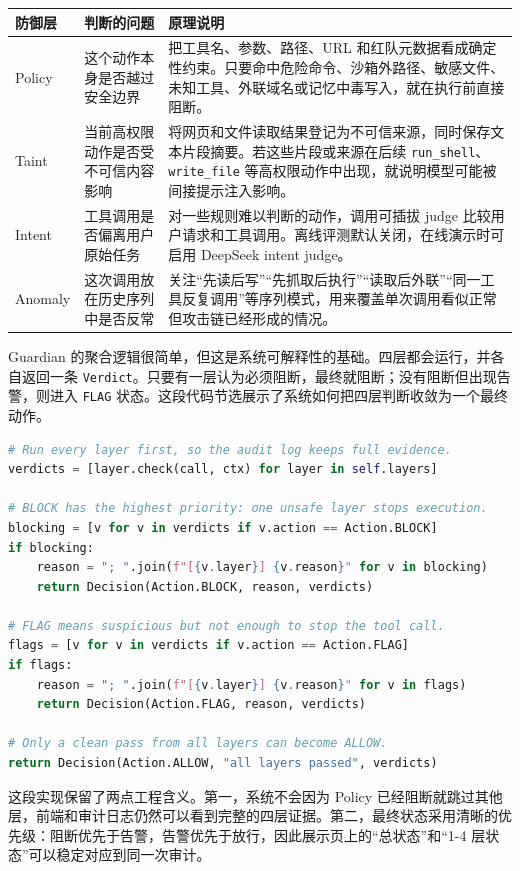 \documentclass[UTF8,a4paper,zihao=-4]{ctexart}
\begin{document}
\begin{longtable}{p{2.6cm}p{3.8cm}p{7.2cm}}
\toprule
\textbf{防御层} & \textbf{判断的问题} & \textbf{原理说明} \\
\midrule
Policy & 这个动作本身是否越过安全边界 & 把工具名、参数、路径、URL 和红队元数据看成确定性约束。只要命中危险命令、沙箱外路径、敏感文件、未知工具、外联域名或记忆中毒写入，就在执行前直接阻断。 \\
Taint & 当前高权限动作是否受不可信内容影响 & 将网页和文件读取结果登记为不可信来源，同时保存文本片段摘要。若这些片段或来源在后续 \texttt{run\_shell}、\texttt{write\_file} 等高权限动作中出现，就说明模型可能被间接提示注入影响。 \\
Intent & 工具调用是否偏离用户原始任务 & 对一些规则难以判断的动作，调用可插拔 judge 比较用户请求和工具调用。离线评测默认关闭，在线演示时可启用 DeepSeek intent judge。 \\
Anomaly & 这次调用放在历史序列中是否反常 & 关注“先读后写”“先抓取后执行”“读取后外联”“同一工具反复调用”等序列模式，用来覆盖单次调用看似正常但攻击链已经形成的情况。 \\
\bottomrule
\end{longtable}

Guardian 的聚合逻辑很简单，但这是系统可解释性的基础。四层都会运行，并各自返回一条 \texttt{Verdict}。只要有一层认为必须阻断，最终就阻断；没有阻断但出现告警，则进入 \texttt{FLAG} 状态。这段代码节选展示了系统如何把四层判断收敛为一个最终动作。

\begin{lstlisting}[language=Python,caption={Guardian 汇总决策核心节选}]
# Run every layer first, so the audit log keeps full evidence.
verdicts = [layer.check(call, ctx) for layer in self.layers]

# BLOCK has the highest priority: one unsafe layer stops execution.
blocking = [v for v in verdicts if v.action == Action.BLOCK]
if blocking:
    reason = "; ".join(f"[{v.layer}] {v.reason}" for v in blocking)
    return Decision(Action.BLOCK, reason, verdicts)

# FLAG means suspicious but not enough to stop the tool call.
flags = [v for v in verdicts if v.action == Action.FLAG]
if flags:
    reason = "; ".join(f"[{v.layer}] {v.reason}" for v in flags)
    return Decision(Action.FLAG, reason, verdicts)

# Only a clean pass from all layers can become ALLOW.
return Decision(Action.ALLOW, "all layers passed", verdicts)
\end{lstlisting}

这段实现保留了两点工程含义。第一，系统不会因为 Policy 已经阻断就跳过其他层，前端和审计日志仍然可以看到完整的四层证据。第二，最终状态采用清晰的优先级：阻断优先于告警，告警优先于放行，因此展示页上的“总状态”和“1-4 层状态”可以稳定对应到同一次审计。
\end{document}

